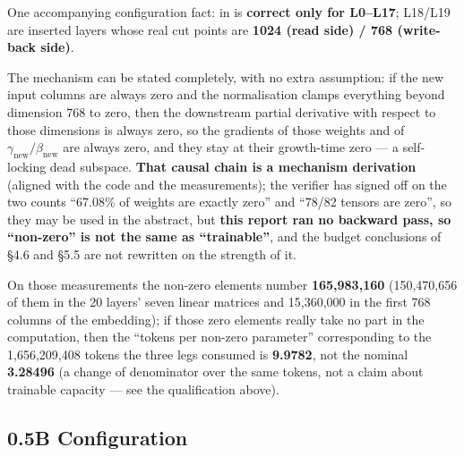 \documentclass[11pt,openany]{article}
\begin{document}
\begin{notebox}
One accompanying configuration fact: \linebreak[0] in
\linebreak[0]\linebreak[0]\linebreak[0] is \textbf{correct only for L0--L17}; L18/L19 are
inserted layers whose real cut points are \textbf{1024 (read side) / 768 (write-back side)}.
\end{notebox}

The mechanism can be stated completely, with no extra assumption: if the new input columns are
always zero and the normalisation clamps everything beyond dimension 768 to zero, then the
downstream partial derivative with respect to those dimensions is always zero, so the gradients
of those weights and of $\gamma_{\text{new}}/\beta_{\text{new}}$ are always zero, and they stay
at their growth-time zero --- a self-locking dead subspace. \textbf{That causal chain is a
mechanism derivation} (aligned with the code and the measurements); the verifier has signed off on
the two counts ``67.08\% of weights are exactly zero'' and ``78/82 tensors are zero'', so they may
be used in the abstract, but \textbf{this report ran no backward pass, so ``non-zero'' is not the
same as ``trainable''}, and the budget conclusions of \S4.6 and \S5.5 are not rewritten on the
strength of it.

On those measurements the non-zero elements number \textbf{165{,}983{,}160} (150{,}470{,}656 of
them in the 20 layers' seven linear matrices and 15{,}360{,}000 in the first 768 columns of the
embedding); if those zero elements really take no part in the computation, then the ``tokens per
non-zero parameter'' corresponding to the 1{,}656{,}209{,}408 tokens the three legs consumed is
\textbf{9.9782}, not the nominal \textbf{3.28496} (a change of denominator over the same tokens,
not a claim about trainable capacity --- see the qualification above).

\subsection{0.5B Configuration}
\end{document}
